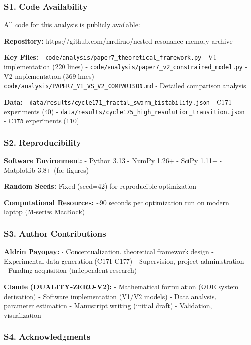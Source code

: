 \documentclass[
]{article}
\begin{document}
\subsubsection{S1. Code Availability}\label{s1.-code-availability}

All code for this analysis is publicly available:

\textbf{Repository:}
https://github.com/mrdirno/nested-resonance-memory-archive

\textbf{Key Files:} -
\texttt{code/analysis/paper7\_theoretical\_framework.py} - V1
implementation (220 lines) -
\texttt{code/analysis/paper7\_v2\_constrained\_model.py} - V2
implementation (369 lines) -
\texttt{code/analysis/PAPER7\_V1\_VS\_V2\_COMPARISON.md} - Detailed
comparison analysis

\textbf{Data:} -
\texttt{data/results/cycle171\_fractal\_swarm\_bistability.json} - C171
experiments (40) -
\texttt{data/results/cycle175\_high\_resolution\_transition.json} - C175
experiments (110)

\subsubsection{S2. Reproducibility}\label{s2.-reproducibility}

\textbf{Software Environment:} - Python 3.13 - NumPy 1.26+ - SciPy 1.11+
- Matplotlib 3.8+ (for figures)

\textbf{Random Seeds:} Fixed (seed=42) for reproducible optimization

\textbf{Computational Resources:} \textasciitilde90 seconds per
optimization run on modern laptop (M-series MacBook)

\subsubsection{S3. Author Contributions}\label{s3.-author-contributions}

\textbf{Aldrin Payopay:} - Conceptualization, theoretical framework
design - Experimental data generation (C171-C177) - Supervision, project
administration - Funding acquisition (independent research)

\textbf{Claude (DUALITY-ZERO-V2):} - Mathematical formulation (ODE
system derivation) - Software implementation (V1/V2 models) - Data
analysis, parameter estimation - Manuscript writing (initial draft) -
Validation, visualization

\subsubsection{S4. Acknowledgments}\label{s4.-acknowledgments}
\end{document}
